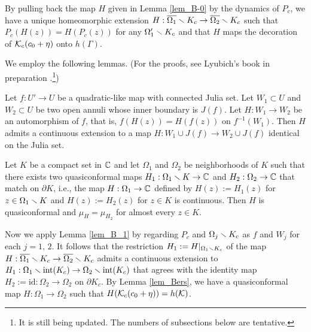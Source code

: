 \medskip
By pulling back the map $H$ given in Lemma \ref{lem_B-0}
by the dynamics of $P_{c}$,
we have a unique homeomorphic extension
$H:\overline{\Omega_1} \smallsetminus K_{c} \to \overline{\Omega_2} \smallsetminus K_{c}$
such that $P_{c}(H(z))=H(P_{c}(z))$ for any $\Omega_1' \smallsetminus K_{c}$
and that $H$ maps the decoration of ${\mathcal{K}}_{c}(c_0+\eta)$ 
onto $h(\Gamma)$.

We employ the following lemmas. 
(For the proofs, see Lyubich's book in preparation \cite{Lyubich Book}.\footnote{It is still being updated. 
The numbers of subsections below are tentative.})

\begin{lem} %
\label{lem_B_1}
Let $f:U' \to U$ be a quadratic-like map with connected Julia set.
Let $W_1 \subset U$ and $W_2 \subset U$ be two open annuli whose
inner boundary is $J(f)$. 
Let $H:W_1 \to W_2$ be an automorphism of $f$,
that is, $f(H(z))=H(f(z))$ on $f^{-1}(W_1)$.
Then $H$ admits a continuous extension to
a map $H:W_1 \cup J(f) \to W_2 \cup J(f)$
identical on the Julia set. 
\end{lem}


\begin{lem}
\label{lem_Bers}
Let $K$ be a compact set in $\mathbb C$ and 
let $\Omega_1$ and $\Omega_2$ 
be neighborhoods of $K$ 
such that there exists two quasiconformal maps
$H_1:\Omega_1  \smallsetminus K \to \mathbb C$ and $H_2: \Omega_2 \to \mathbb C$
that match on $\partial K$, i.e., the map
$H:\Omega_1 \to \mathbb C$ defined by $H(z):=H_1(z)$
for $z \in \Omega_1  \smallsetminus K$ 
and $H(z):=H_2(z)$ for $z \in K$
is continuous. 
Then $H$ is quasiconformal and $\mu_H=\mu_{H_2}$
for almost every $z \in K$.
\end{lem}

Now we apply Lemma \ref{lem_B_1} by regarding $P_{c}$ and $\Omega_j \smallsetminus K_{c}$
as $f$ and $W_j$ for each $j=1,\,2$.
It follows that the restriction $H_1:=H|_{\Omega_1 \smallsetminus K_{c}}$
of the map 
$H:\overline{\Omega_1} \smallsetminus K_{c} \to \overline{\Omega_2} \smallsetminus K_{c}$
admits a continuous extension to 
$H_1:\Omega_1 \smallsetminus \mathrm{int}(K_{c}) \to \Omega_2 \smallsetminus \mathrm{int}(K_{c})$
that agrees with the identity map $H_2:=\mathrm{id}:\Omega_2 \to \Omega_2$ on $\partial K_c$.
By Lemma \ref{lem_Bers},
we have a quasiconformal map $H:\Omega_1 \to \Omega_2$ 
such that $H({\mathcal{K}}_{c}(c_0+\eta))=h({\mathcal{K}})$.
 \QED 













